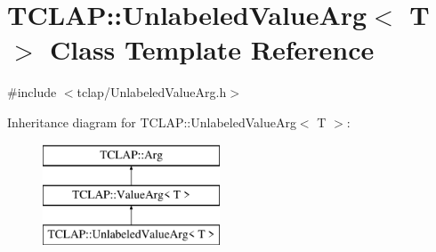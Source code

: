 \hypertarget{class_t_c_l_a_p_1_1_unlabeled_value_arg}{}\section{T\+C\+L\+A\+P\+:\+:Unlabeled\+Value\+Arg$<$ T $>$ Class Template Reference}
\label{class_t_c_l_a_p_1_1_unlabeled_value_arg}


{\ttfamily \#include $<$tclap/\+Unlabeled\+Value\+Arg.\+h$>$}

Inheritance diagram for T\+C\+L\+A\+P\+:\+:Unlabeled\+Value\+Arg$<$ T $>$\+:\begin{figure}[H]
\begin{center}
\leavevmode
\includegraphics[height=3.000000cm]{class_t_c_l_a_p_1_1_unlabeled_value_arg}
\end{center}
\end{figure}
